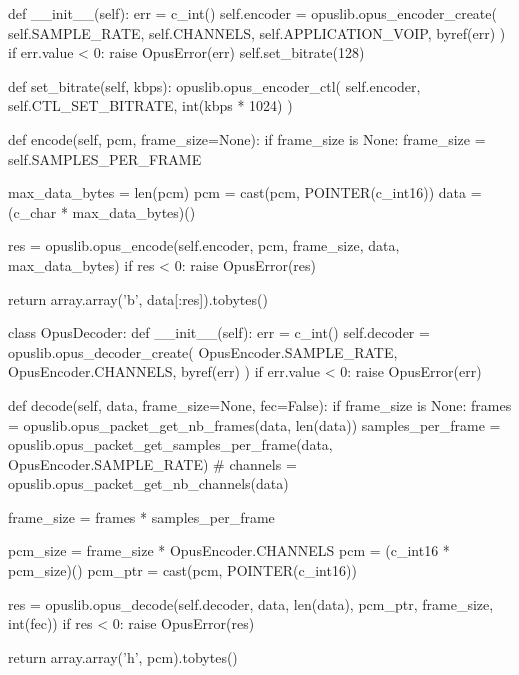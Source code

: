 \begin{pythoncode}
    def __init__(self):
        err = c_int()
        self.encoder = opuslib.opus_encoder_create(
            self.SAMPLE_RATE, self.CHANNELS, self.APPLICATION_VOIP, byref(err)
        )
        if err.value < 0:
            raise OpusError(err)
        self.set_bitrate(128)

    def set_bitrate(self, kbps):
        opuslib.opus_encoder_ctl(
            self.encoder, self.CTL_SET_BITRATE, int(kbps * 1024)
        )

    def encode(self, pcm, frame_size=None):
        if frame_size is None:
            frame_size = self.SAMPLES_PER_FRAME

        max_data_bytes = len(pcm)
        pcm = cast(pcm, POINTER(c_int16))
        data = (c_char * max_data_bytes)()

        res = opuslib.opus_encode(self.encoder, pcm, frame_size, data, max_data_bytes)
        if res < 0:
            raise OpusError(res)

        return array.array('b', data[:res]).tobytes()


class OpusDecoder:
    def __init__(self):
        err = c_int()
        self.decoder = opuslib.opus_decoder_create(
            OpusEncoder.SAMPLE_RATE, OpusEncoder.CHANNELS, byref(err)
        )
        if err.value < 0:
            raise OpusError(err)

    def decode(self, data, frame_size=None, fec=False):
        if frame_size is None:
            frames = opuslib.opus_packet_get_nb_frames(data, len(data))
            samples_per_frame = opuslib.opus_packet_get_samples_per_frame(data, OpusEncoder.SAMPLE_RATE)
            # channels = opuslib.opus\_packet\_get\_nb\_channels(data)

            frame_size = frames * samples_per_frame

        pcm_size = frame_size * OpusEncoder.CHANNELS
        pcm = (c_int16 * pcm_size)()
        pcm_ptr = cast(pcm, POINTER(c_int16))

        res = opuslib.opus_decode(self.decoder, data, len(data), pcm_ptr, frame_size, int(fec))
        if res < 0:
            raise OpusError(res)

        return array.array('h', pcm).tobytes()
\end{pythoncode}
